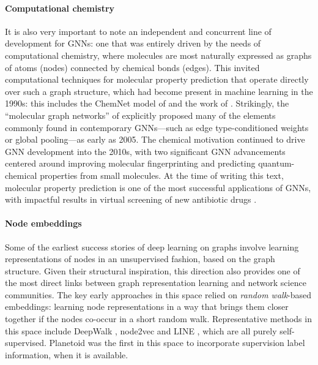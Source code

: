 \paragraph{Computational chemistry}
It is also very important to note an independent and concurrent line of development for GNNs: one that was entirely driven by the needs of computational chemistry, where 
 molecules are most naturally expressed as graphs of atoms (nodes) connected by chemical bonds (edges). 
 This invited computational techniques for molecular property prediction that operate directly over such a graph structure, which had become present in machine learning in the 1990s: this includes the ChemNet model of %
 \cite{kireev1995chemnet} and the work of %
 \cite{baskin1997neural}. Strikingly, the ``molecular graph networks'' of \cite{merkwirth2005automatic} explicitly proposed many of the elements commonly found in contemporary GNNs---such as edge type-conditioned weights or global pooling---as early as 2005. The chemical motivation continued to drive GNN development into the 2010s, with two significant GNN advancements centered around improving molecular fingerprinting \citep{duvenaud2015convolutional} and predicting quantum-chemical properties \citep{gilmer2017neural} from small molecules. 
 At the time of writing this text, molecular property prediction is one of the most successful applications of GNNs, with impactful results in virtual screening of new antibiotic drugs \citep{stokes2020deep}.



\paragraph{Node embeddings} Some of the earliest success stories of deep learning on graphs involve learning representations of nodes in an unsupervised fashion, based on the graph structure. Given their structural inspiration, this direction also provides one of the most direct links between graph representation learning and network science communities. The key early approaches in this space relied on \emph{random walk}-based embeddings: learning node representations in a way that brings them closer together if the nodes co-occur in a short random walk. Representative methods in this space include DeepWalk \citep{perozzi2014deepwalk}, node2vec \citep{grover2016node2vec} and LINE \citep{tang2015line}, which are all purely self-supervised. Planetoid \citep{yang2016revisiting} was the first in this space to incorporate supervision label information, when it is available.

